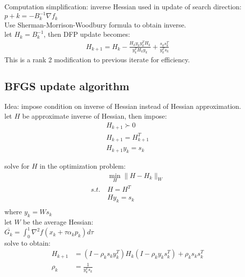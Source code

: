 \documentclass[8pt,letter]{article}
\begin{document}
\begin{multicols*}{2}
  Computation simplification: inverse Hessian used in update of search direction: $p+k = - B_k^{-1} \nabla f_k$\\
  Use Sherman-Morrison-Woodbury formula to obtain inverse.\\
  let $H_k = B_k^{-1}$, then DFP update becomes:\\
  \begin{align*}
    H_{k+1} = H_k - \frac{H_k y_k y_k^T H_k}{y_k^T H_k y_k} + \frac{s_k s_k^T}{y_k^T s_k}
  \end{align*}
  This is a rank 2 modification to previous iterate for efficiency.
  
  \subsection{BFGS update algorithm}

  Idea: impose condition on inverse of Hessian instead of Hessian approximation.\\

  let $H$ be approximate inverse of Hessian, then impose:
  \begin{align*}
    H_{k+1} \succ 0\\
    H_{k+1} = H_{k+1}^T\\
    H_{k+1} y_k = s_k
  \end{align*}

  solve for $H$ in the optimization problem:
  \begin{align*}
    &\min_H \|H-H_k\|_W\\
    s.t.\ &H=H^T\\
    &H y_k = s_k\\
  \end{align*}
  where $y_k=W s_k$\\
  
  let $W$ be the average Hessian:\\
  $\bar{G_k}=\int_0^1 \nabla^2 f(x_k + \tau \alpha_k p_k) d \tau$\\

  solve to obtain:
  \begin{align*}
    H_{k+1} & = (I-\rho_k s_k y_k^T) H_k (I - \rho_k y_k s_k^T) + \rho_k s_k s_k^T\\
    \rho_k & = \frac{1}{y_k^T s_k}
  \end{align*}
  


\end{multicols*}
\end{document}
